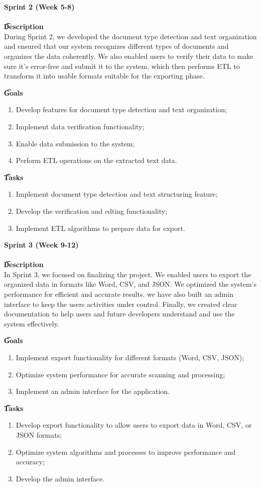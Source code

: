 \textbf{\large Sprint 2 (Week 5-8)}\\\\
\textbf{\t Description}\\
During Sprint 2, we developed the document type detection and text organization and ensured that our system recognizes different types of documents and organizes the data coherently. We also enabled users to verify their data to make sure it's error-free and submit it to the system, which then performs ETL to transform it into usable formats suitable for the exporting phase. 


\textbf{\t Goals}
\begin{enumerate}
  \item Develop features for document type detection and text organization;
  \item Implement data verification functionality;
  \item Enable data submission to the system;
  \item Perform ETL operations on the extracted text data.
\end{enumerate}

\textbf{\t Tasks}
\begin{enumerate}
  \item Implement document type detection and text structuring feature;
  \item Develop the verification and edting functionality;
  \item Implement ETL algorithms to prepare data for export.
\end{enumerate}

\textbf{\large Sprint 3 (Week 9-12)}\\\\
\textbf{\t Description}\\
In Sprint 3, we focused on finalizing the project. We enabled users to export the organized data in formats like Word, CSV, and JSON. We optimized the system's performance for efficient and accurate results. we have also built an admin interface to keep the users activities under control.
Finally, we created clear documentation to help users and future developers understand and use the system effectively.

\textbf{\t Goals}
\begin{enumerate}
  \item Implement export functionality for different formats (Word, CSV, JSON);
  \item Optimize system performance for accurate scanning and processing;
  \item Implement an admin interface for the application.
\end{enumerate}
\textbf{\t Tasks}
\begin{enumerate}
  \item Develop export functionality to allow users to export data in Word, CSV, or JSON formats;
  \item Optimize system algorithms and processes to improve performance and accuracy;
  \item Develop the admin interface.
\end{enumerate}

